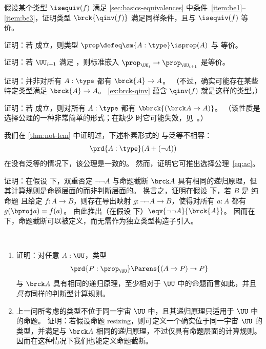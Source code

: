 \begin{ex}\label{ex:brck-qinv}
  假设某个类型 $\isequiv(f)$ 满足 \cref{sec:basics-equivalences} 中条件~\ref{item:be1}--\ref{item:be3}，证明类型 $\brck{\qinv(f)}$ 满足同样条件，且与 $\isequiv(f)$ 等价。
\end{ex}

\begin{ex}\label{ex:lem-impl-prop-equiv-bool}
  证明：若 \LEM{} 成立，则类型 $\prop \defeq \sm{A:\type} \isprop(A)$ 与 \bool 等价。
\end{ex}

\begin{ex}\label{ex:lem-impred}
  证明：若 $\UU_{i+1}$ 满足 \LEM{}，则标准嵌入 $\prop_{\UU_i} \to \prop_{\UU_{i+1}}$ 是等价。
\end{ex}

\begin{ex}\label{ex:not-brck-A-impl-A}
  证明：并非对所有 $A:\type$ 都有 $\brck{A} \to A$。
  （不过，确实可能存在某些特定类型满足 $\brck{A}\to A$。
  \cref{ex:brck-qinv} 蕴含 $\qinv(f)$ 就是这样的类型。）
\end{ex}

\begin{ex}\label{ex:lem-impl-simple-ac}
  证明：若 \LEM{} 成立，则对所有 $A:\type$ 都有 $\bbrck{(\brck A \to A)}$。
  （该性质是选择公理的一种非常简单的形式；在缺少 \LEM{} 时它可能失效，见~\cite{krausgeneralizations}。）
\end{ex}

\begin{ex}\label{ex:naive-lem-impl-ac}
  我们在 \cref{thm:not-lem} 中证明过，下述朴素形式的 \LEM{} 与泛等不相容：
  \[ \prd{A:\type} (A+(\neg A)) \]
  在没有泛等的情况下，该公理是一致的。
  然而，证明它可推出选择公理~\eqref{eq:ac}。
\end{ex}

\begin{ex}\label{ex:lem-brck}
  证明：在假设 \LEM{} 下，双重否定 $\neg \neg A$ 与命题截断 $\brck A$ 具有相同的递归原理，但其计算规则是命题层面的而非判断层面的。
  换言之，证明在假设 \LEM{} 下，若 $B$ 是 纯命题 且给定 $f:A\to B$，则存在导出映射 $g:\neg\neg A \to B$，使得对所有 $a:A$ 都有 $g(\bproj a) = f(a)$。
  由此推出（在假设 \LEM{} 下）$\eqv{\neg\neg A}{\brck{A}}$。
  因而在 \LEM{} 下，命题截断可以被定义，而无需作为独立类型构造子引入。
\end{ex}

\begin{ex}\label{ex:impred-brck}\ 
  \begin{enumerate}
  \item 证明：对任意 $A : \UU$，类型
    \[\prd{P:\prop_{\UU}} \Parens{(A\to P)\to P}\]
    与 $\brck A$ 具有相同的递归原理，至少相对于 $\UU$ 中的命题而言如此，并且\emph{具有}同样的判断型计算规则。
  \item 上一问所考虑的类型不位于同一宇宙 $\UU$ 中，且其递归原理只适用于 $\UU$ 中的命题。
    证明：若假设命题 resizing，则可定义一个确实位于同一宇宙 $\UU$ 的类型，并满足与 $\brck A$ 相同的递归原理，不过仅具有命题层面的计算规则。
    因而在这种情况下我们也能定义命题截断。
  \end{enumerate}
\end{ex}

